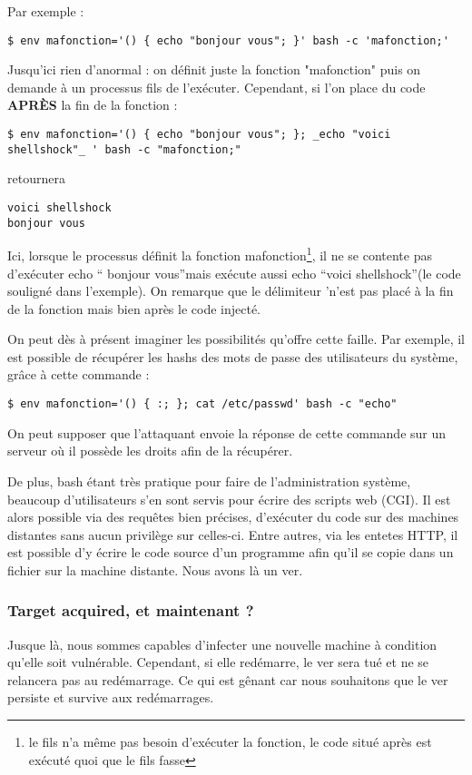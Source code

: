 \documentclass[]{projet-M1}
\begin{document}
Par exemple \cite{Shellshock:linuxfr}: 
\begin{lstlisting}
$ env mafonction='() { echo "bonjour vous"; }' bash -c 'mafonction;'
\end{lstlisting}
Jusqu'ici rien d'anormal : on définit juste la fonction "mafonction" puis on demande à un processus fils de l'exécuter. Cependant, si l'on place du code \textbf{APRÈS} la fin de la fonction : 
\begin{lstlisting}
$ env mafonction='() { echo "bonjour vous"; }; _echo "voici shellshock"_ ' bash -c "mafonction;"
\end{lstlisting}
retournera 
\begin{lstlisting}
voici shellshock
bonjour vous
\end{lstlisting}
Ici, lorsque le processus définit la fonction \og mafonction\fg \footnote{le fils n'a même pas besoin d'exécuter la fonction, le code situé après est exécuté quoi que le fils fasse}, il ne se contente pas d'exécuter \og echo `` bonjour vous''\fg mais exécute aussi \og echo ``voici shellshock''\fg (le code souligné dans l'exemple). On remarque que le délimiteur \og '\fg n'est pas placé à la fin de la fonction mais bien après le code injecté.

On peut dès à présent imaginer les possibilités qu'offre cette \gls{faille}. Par exemple, il est possible de récupérer les \gls{hashs} des mots de passe des utilisateurs du système, grâce à cette commande : 
\begin{lstlisting}
$ env mafonction='() { :; }; cat /etc/passwd' bash -c "echo"
\end{lstlisting}
On peut supposer que l'attaquant envoie la réponse de cette commande sur un serveur où il possède les droits afin de la récupérer. 

De plus, \Gls{bash} étant très pratique pour faire de l'administration système, beaucoup d'utilisateurs s'en sont servis pour écrire des scripts web (\gls{CGI}). Il est alors possible via des requêtes bien précises, d’exécuter du code sur des machines distantes sans aucun privilège sur celles-ci. Entre autres, via les \label{http-head}\gls{entetes HTTP}, il est possible d'y écrire le code source d'un programme afin qu'il se copie dans un fichier sur la machine distante. Nous avons là un ver.

\subsubsection{Target acquired, et maintenant ?}
Jusque là, nous sommes capables d'infecter une nouvelle machine à condition qu'elle soit vulnérable. Cependant, si elle redémarre, le ver sera tué et ne se relancera pas au redémarrage. Ce qui est gênant car nous souhaitons que le ver persiste et survive aux redémarrages. 
\end{document}
